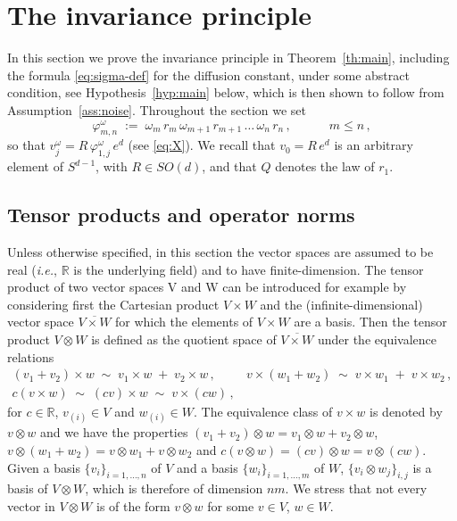\documentclass[a4paper,reqno,11pt]{amsart}
\numberwithin{equation}{section}
\newcommand{\gp}{\varphi}
\newcommand{\go}{\omega}
\newcommand{\R}{\mathbb{R}}
\begin{document}
\section{The invariance principle}

\label{sec:preparation}

In this section we prove the invariance principle 
in Theorem~\ref{th:main}, including the formula \eqref{eq:sigma-def}
for the diffusion constant, under some abstract condition,
see Hypothesis~\ref{hyp:main} below,
which is then shown to follow from Assumption~\ref{ass:noise}.
Throughout the section we set
\begin{equation} \label{eq:phi}
	\gp_{m,n}^\go \;:=\; \go_m \, r_m \, 	\go_{m+1} \, r_{m+1} \,
	\ldots \, \go_n \, r_n \,, \qquad \quad m \le n \,,
\end{equation}
so that $v_j^\go = R\, \gp_{1,j}^\go \, e^d$ (see \eqref{eq:X}).
We recall that $v_0 = R\,e^d$ is an arbitrary element of $S^{d-1}$,
with $R \in SO(d)$, and that $Q$ denotes the law of $r_1$.


\smallskip

\subsection{Tensor products and operator norms}
\label{sec:tensors}

Unless otherwise specified, in this section the vector spaces
are assumed to be real ({\sl i.e.}, $\R$ is the underlying field)
and to have finite-dimension. 
The tensor product  of two vector spaces V and W can be introduced for example
by considering first 
the Cartesian product $V\times W$ and the (infinite-dimensional) vector space 
$\overline {V\times W}$ for which
the elements of $V\times W$ are a basis. Then the tensor product 
$V\otimes W$ is defined as the quotient space of $\overline {V\times W}$ under the 
equivalence relations 
\begin{gather*}
(v_1+v_2)\times w \;\sim\; v_1\times w \;+\; v_2\times w \,, \qquad \ \
v\times (w_1+w_2) \;\sim\; v\times w_1 \;+\; v\times w_2 \,, \\
c (v\times w) \;\sim\;  (cv)\times w \;\sim\; v \times (cw)\,,
\end{gather*}
for $c\in \R$, $v_{(i)}\in V$ and $w_{(i)}\in W$.
The equivalence class of $v\times w$ is denoted by $v\otimes w$ 
and we have the properties
$(v_1+v_2) \otimes w= v_1\otimes w+ v_2\otimes w$,
$v\otimes (w_1+w_2)= v\otimes w_1+ v\otimes w_2$
and $c (v\otimes w)= (cv)\otimes w= v\otimes (cw)$.
Given a basis $\{v_i\}_{i=1, \ldots , n}$ of $V$
and a basis $\{w_i\}_{i=1, \ldots , m}$ of $W$, $\{ v_i \otimes w_j\}_{i,j}$
is a basis of $V\otimes W$, which is therefore of dimension $nm$.
We stress that not every vector in $V \otimes W$ is of the form
$v \otimes w$ for some $v \in V$, $w \in W$.
\end{document}
